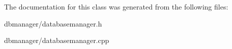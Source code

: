 The documentation for this class was generated from the following files\-:\begin{DoxyCompactItemize}
\item 
dbmanager/databasemanager.\-h\item 
dbmanager/databasemanager.\-cpp\end{DoxyCompactItemize}
